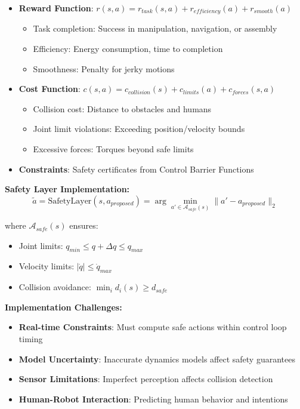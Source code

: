 \documentclass[12pt]{article}
\begin{document}
{{{{\begin{itemize}
\item \textbf{Reward Function}: $r(s,a) = r_{task}(s,a) + r_{efficiency}(a) + r_{smooth}(a)$
\begin{itemize}
\item Task completion: Success in manipulation, navigation, or assembly
\item Efficiency: Energy consumption, time to completion
\item Smoothness: Penalty for jerky motions
\end{itemize}

\item \textbf{Cost Function}: $c(s,a) = c_{collision}(s) + c_{limits}(a) + c_{forces}(s,a)$
\begin{itemize}
\item Collision cost: Distance to obstacles and humans
\item Joint limit violations: Exceeding position/velocity bounds
\item Excessive forces: Torques beyond safe limits
\end{itemize}

\item \textbf{Constraints}: Safety certificates from Control Barrier Functions
\end{itemize}

\textbf{Safety Layer Implementation:}
\begin{equation}
\tilde{a} = \text{SafetyLayer}(s, a_{proposed}) = \arg\min_{a' \in \mathcal{A}_{safe}(s)} \|a' - a_{proposed}\|_2
\end{equation}

where $\mathcal{A}_{safe}(s)$ ensures:
\begin{itemize}
\item Joint limits: $q_{min} \leq q + \Delta q \leq q_{max}$
\item Velocity limits: $|\dot{q}| \leq \dot{q}_{max}$
\item Collision avoidance: $\min_i d_i(s) \geq d_{safe}$
\end{itemize}

\textbf{Implementation Challenges:}
\begin{itemize}
\item \textbf{Real-time Constraints}: Must compute safe actions within control loop timing
\item \textbf{Model Uncertainty}: Inaccurate dynamics models affect safety guarantees
\item \textbf{Sensor Limitations}: Imperfect perception affects collision detection
\item \textbf{Human-Robot Interaction}: Predicting human behavior and intentions
\end{itemize}

}}}}
\end{document}

